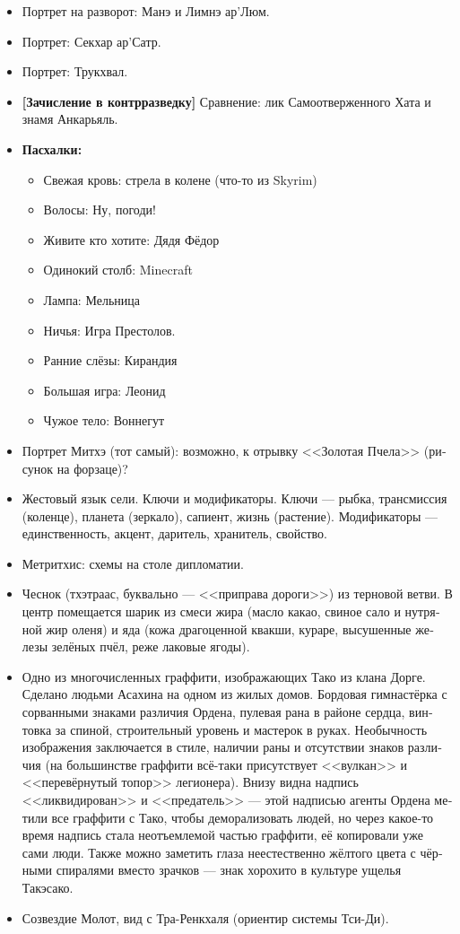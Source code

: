 \documentclass[a4paper,12pt,fleqn]{book}\usepackage{polyglossia}\setdefaultlanguage[babelshorthands=true]{russian}\setotherlanguage{english}\defaultfontfeatures{Ligatures=TeX,Mapping=tex-text}\usepackage{xcolor}\newcommand{\ml}[3]{#2}
\begin{document}
{\begin{itemize}
\item Портрет на разворот: Манэ и Лимнэ ар'Люм.
\item Портрет: Секхар ар'Сатр.
\item Портрет: Трукхвал.
\item \textbf{[Зачисление в контрразведку]} Сравнение: лик Самоотверженного Хата и знамя Анкарьяль.
\item \textbf{Пасхалки:}
\begin{itemize}
\item Свежая кровь: стрела в колене (что-то из Skyrim)
\item Волосы: Ну, погоди!
\item Живите кто хотите: Дядя Фёдор
\item Одинокий столб: Minecraft
\item Лампа: Мельница
\item Ничья: Игра Престолов.
\item Ранние слёзы: Кирандия
\item Большая игра: Леонид
\item Чужое тело: Воннегут
\end{itemize}
\item Портрет Митхэ (тот самый): возможно, к отрывку <<Золотая Пчела>> (рисунок на форзаце)?
\item Жестовый язык сели.
Ключи и модификаторы.
Ключи --- рыбка, трансмиссия (коленце), планета (зеркало), сапиент, жизнь (растение).
Модификаторы --- единственность, акцент, даритель, хранитель, свойство.
\item Метритхис: схемы на столе дипломатии.
\item Чеснок (тхэтраас, буквально --- <<приправа дороги>>) из терновой ветви. 
В центр помещается шарик из смеси жира (масло какао, свиное сало и нутряной жир оленя) и яда (кожа драгоценной квакши, кураре, высушенные железы зелёных пчёл, реже лаковые ягоды).
\item Одно из многочисленных граффити, изображающих Тако из клана Дорге.
Сделано людьми Асахина на одном из жилых домов.
Бордовая гимнастёрка с сорванными знаками различия Ордена, пулевая рана в районе сердца, винтовка за спиной, строительный уровень и мастерок в руках.
Необычность изображения заключается в стиле, наличии раны и отсутствии знаков различия (на большинстве граффити всё-таки присутствует <<вулкан>> и <<перевёрнутый топор>> легионера).
Внизу видна надпись <<ликвидирован>> и <<предатель>> --- этой надписью агенты Ордена метили все граффити с Тако, чтобы деморализовать людей, но через какое-то время надпись стала неотъемлемой частью граффити, её копировали уже сами люди.
Также можно заметить глаза неестественно жёлтого цвета с чёрными спиралями вместо зрачков --- знак хорохито в культуре ущелья Такэсако.
\item Созвездие Молот, вид с Тра-Ренкхаля (ориентир системы Тси-Ди).
\end{itemize}

}
\end{document}
